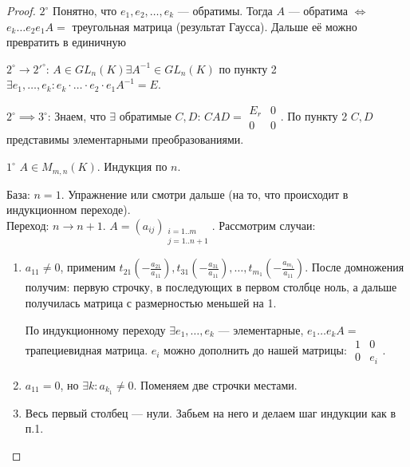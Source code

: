 \begin{proof}
    $2^\circ$ Понятно, что $e_1, e_2, \ldots, e_k$ --- обратимы. Тогда $A$ --- обратима  $\iff$  $e_k\ldots e_2e_1 A = $ треугольная матрица (результат Гаусса). Дальше её можно превратить в единичную

    $2^\circ \to 2'^\circ$:  $A \in GL_n(K) \exists A^{-1} \in GL_n(K)$ по пункту 2  $\exists e_1, \ldots, e_k\!: e_k \cdot \ldots \cdot e_2 \cdot e_1 A^{-1} = E$.

    $2^\circ \implies 3^\circ$: Знаем, что  $\exists$ обратимые  $C, D$:  $CAD = \begin{array}{|c|c|} E_r & 0 \\ \hline 0 & 0 \end{array}$. По пункту 2  $C, D$ представимы элементарными преобразованиями.

    $1^\circ$ $A \in M_{m, n}(K)$. Индукция по  $n$.

    База: $n = 1$. Упражнение или смотри дальше (на то, что происходит в индукционном переходе).\\
    Переход: $n \to n+1$.  $A = (a_{ij})_{\substack{i = 1..m \\ j=1..{n+1}}}$. Рассмотрим случаи:
    \begin{enumerate}
        \item $a_{11} \neq 0$, применим $t_{21}(-\frac{a_{21}}{a_{11}}), t_{31}(-\frac{a_{31}}{a_{11}}),\ldots, t_{m_1}(-\frac{a_{m_1}}{a_{11}})$. После домножения получим: первую строчку, в последующих в первом столбце ноль, а дальше получилась матрица с размерностью меньшей на 1.

        По индукционному переходу $\exists e_1, \ldots, e_k$ --- элементарные, $e_1 \ldots e_k A = $ трапециевидная матрица. $e_i$ можно дополнить до нашей матрицы:  $\begin{array}{c|c} 1 & 0 \\ \hline 0 & e_i \end{array}$.

        \item $a_{11} = 0$, но $\exists k\!: a_{k_1} \neq 0$. Поменяем две строчки местами.

        \item Весь первый столбец --- нули. Забьем на него и делаем шаг индукции как в п.1.
    \end{enumerate}


\end{proof}
